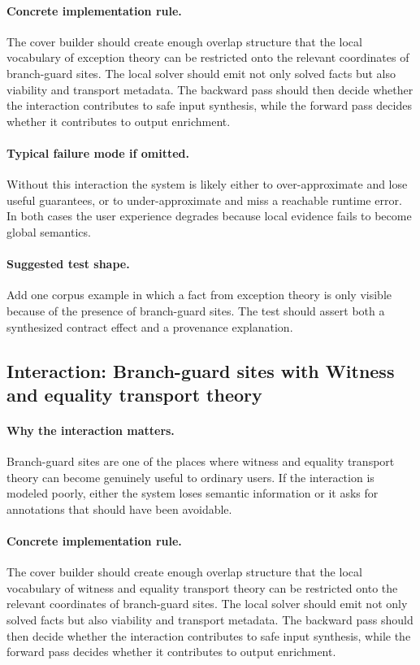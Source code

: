 \documentclass[11pt]{report}
\theoremstyle{definition}
\theoremstyle{plain}
\begin{document}
\paragraph{Concrete implementation rule.}
The cover builder should create enough overlap structure that the local
vocabulary of exception theory can be restricted onto the relevant
coordinates of branch-guard sites. The local solver should emit not only
solved facts but also viability and transport metadata. The backward pass
should then decide whether the interaction contributes to safe input
synthesis, while the forward pass decides whether it contributes to output
enrichment.

\paragraph{Typical failure mode if omitted.}
Without this interaction the system is likely either to over-approximate and
lose useful guarantees, or to under-approximate and miss a reachable runtime
error. In both cases the user experience degrades because local evidence
fails to become global semantics.

\paragraph{Suggested test shape.}
Add one corpus example in which a fact from exception theory is only
visible because of the presence of branch-guard sites. The test should
assert both a synthesized contract effect and a provenance explanation.

\subsection{Interaction: Branch-guard sites with Witness and equality transport theory}

\paragraph{Why the interaction matters.}
Branch-guard sites are one of the places where witness and equality transport theory can become
genuinely useful to ordinary users. If the interaction is modeled poorly,
either the system loses semantic information or it asks for annotations that
should have been avoidable.

\paragraph{Concrete implementation rule.}
The cover builder should create enough overlap structure that the local
vocabulary of witness and equality transport theory can be restricted onto the relevant
coordinates of branch-guard sites. The local solver should emit not only
solved facts but also viability and transport metadata. The backward pass
should then decide whether the interaction contributes to safe input
synthesis, while the forward pass decides whether it contributes to output
enrichment.
\end{document}
